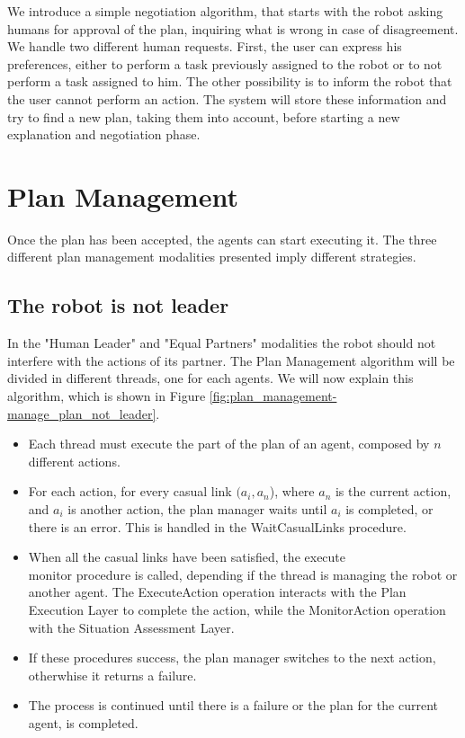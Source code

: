 We introduce a simple negotiation algorithm, that starts with the robot asking humans for approval of the plan, inquiring what is wrong in case of disagreement. We handle two different human requests. First, the user can express his preferences, either to perform a task previously assigned to the robot or to not perform a task assigned to him. The other possibility is to inform the robot that the user cannot perform an action. The system will store these information and try to find a new plan, taking them into account, before starting a new explanation and negotiation phase.
 
\section{Plan Management}
\label{sec:plan_management-planExecution}

Once the plan has been accepted, the agents can start executing it. The three different plan management modalities presented imply different strategies.


\subsection{The robot is not leader}
\label{subsec:plan_management-robot_not_leader_manager}
In the "Human Leader" and "Equal Partners" modalities the robot should not interfere with the actions of its partner. The Plan Management algorithm will be divided in different threads, one for each agents. We will now explain this algorithm, which is shown in Figure \ref{fig:plan_management-manage_plan_not_leader}.
\begin{itemize}
  \item Each thread must execute the part of the plan of an agent, composed by $n$ different actions.
  \item For each action, for every casual link $(a_i,a_n$), where $a_n$ is the current action, and $a_i$ is another action, the plan manager waits until $a_i$ is completed, or there is an error. This is handled in the WaitCasualLinks procedure.
  \item When all the casual links have been satisfied, the execute\\monitor procedure is called, depending if the thread is managing the robot or another agent. The ExecuteAction operation interacts with the Plan Execution Layer to complete the action, while the MonitorAction operation with the Situation Assessment Layer.
  \item If these procedures success, the plan manager switches to the next action, otherwhise it returns a failure.
  \item The process is continued until there is a failure or the plan for the current agent, is completed.
\end{itemize} 

